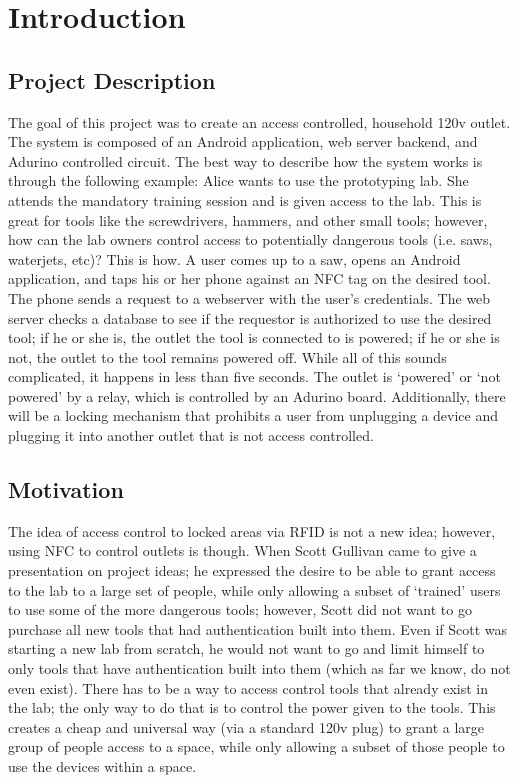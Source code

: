 \documentclass{sigchi}
\begin{document}
\section{Introduction}

\subsection {Project Description}
The goal of this project was to create an access controlled, household 120v outlet. The system is composed of an Android application, web server backend, and Adurino controlled circuit. The best way to describe how the system works is through the following example: Alice wants to use the prototyping lab. She attends the mandatory training session and is given access to the lab. This is great for tools like the screwdrivers, hammers, and other small tools; however, how can the lab owners control access to potentially dangerous tools (i.e. saws, waterjets, etc)? This is how. A user comes up to a saw, opens an Android application, and taps his or her phone against an NFC tag on the desired tool. The phone sends a request to a webserver with the user’s credentials. The web server checks a database to see if the requestor is authorized to use the desired tool; if he or she is, the outlet the tool is connected to is powered; if he or she is not, the outlet to the tool remains powered off. While all of this sounds complicated, it happens in less than five seconds. The outlet is ‘powered’ or ‘not powered’ by a relay, which is controlled by an Adurino board. Additionally, there will be a locking mechanism that prohibits a user from unplugging a device and plugging it into another outlet that is not access controlled. 

\subsection {Motivation}

The idea of access control to locked areas via RFID is not a new idea; however, using NFC to control outlets is though. When Scott Gullivan came to give a presentation on project ideas; he expressed the desire to be able to grant access to the lab to a large set of people, while only allowing a subset of ‘trained’ users to use some of the more dangerous tools; however, Scott did not want to go purchase all new tools that had authentication built into them. Even if Scott was starting a new lab from scratch, he would not want to go and limit himself to only tools that have authentication built into them (which as far we know, do not even exist). There has to be a way to access control tools that already exist in the lab; the only way to do that is to control the power given to the tools. This creates a cheap and universal way (via a standard 120v plug) to grant a large group of people access to a space, while only allowing a subset of those people to use the devices within a space. 
\end{document}

